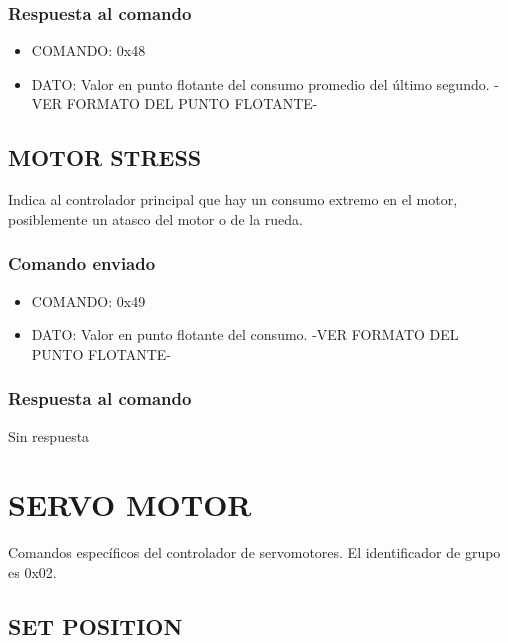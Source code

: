 \documentclass[a4paper,11pt]{article}
\begin{document}
\subsubsection*{Respuesta al comando}
\label{motor_consumption_respuesta}

\begin{itemize}
	\item{COMANDO:} 0x48
	\item{DATO:} Valor en punto flotante del consumo promedio del \'ultimo segundo. -VER FORMATO DEL PUNTO FLOTANTE-
\end{itemize}

\subsection{MOTOR STRESS}
\label{motor_stress}

Indica al controlador principal que hay un consumo extremo en el motor, posiblemente un atasco del motor o de la rueda.

\subsubsection*{Comando enviado}
\label{motor_stress_comando_enviado}

\begin{itemize}
	\item{COMANDO:} 0x49
	\item{DATO:} Valor en punto flotante del consumo. -VER FORMATO DEL PUNTO FLOTANTE-
\end{itemize}

\subsubsection*{Respuesta al comando}
\label{motor_stress_respuesta}

Sin respuesta

\section{SERVO MOTOR}
\label{grupo_servo_motor}

Comandos espec\'ificos del controlador de servomotores.
El identificador de grupo es 0x02.

\subsection{SET POSITION}
\label{set_position}
\end{document}
